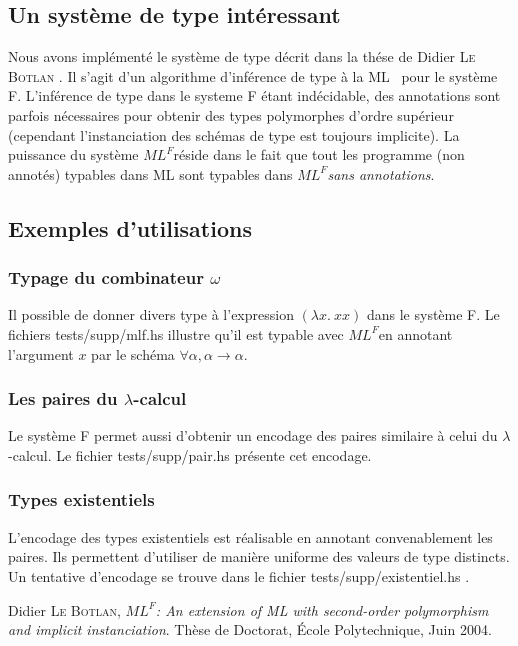 \documentclass[a4paper]{article}
\def\mlf{$ML^F$}
\begin{document}
\subsection{Un système de type intéressant}

Nous avons implémenté le système de type décrit dans la thése de
Didier \textsc{Le Botlan} \cite{lebotlan}. Il s'agit
d'un algorithme d'inférence de type \og à la ML \fg~pour le système F.
L'inférence de type dans le systeme F étant indécidable, des
annotations sont parfois nécessaires pour obtenir des types polymorphes
d'ordre supérieur (cependant l'instanciation des schémas de type est
toujours implicite). La puissance du système \mlf réside dans le fait
que tout les programme (non annotés) typables dans ML sont typables
dans \mlf \emph{sans annotations}.

\subsection{Exemples d'utilisations}

\subsubsection{Typage du combinateur $\omega$}
Il possible de donner divers type à l'expression $(\lambda x.\ x x)$ dans le système F. Le fichiers \og tests/supp/mlf.hs \fg{} illustre qu'il est typable avec \mlf en annotant l'argument $x$ par le schéma $\forall \alpha, \alpha \rightarrow \alpha$.


\subsubsection{Les paires du $\lambda$-calcul}
Le système F permet aussi d'obtenir un encodage des paires similaire à celui du $\lambda$-calcul. Le fichier \og tests/supp/pair.hs \fg{} présente cet encodage.

\subsubsection{Types existentiels}
L'encodage des types existentiels est réalisable en annotant convenablement les paires. Ils permettent d'utiliser de manière uniforme des valeurs de type distincts. Un tentative d'encodage se trouve dans le fichier \og tests/supp/existentiel.hs \fg.

\begin{thebibliography}{1}

  Didier \textsc{Le Botlan},
  \emph{\mlf : An extension of ML with second-order polymorphism and
    implicit instanciation}.
  Thèse de Doctorat,
  École Polytechnique,
  Juin 2004.

\end{thebibliography}
\end{document}
